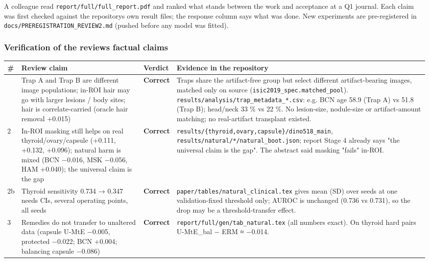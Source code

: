 {\small
A colleague read \texttt{report/full/full\_report.pdf} and ranked what stands between the work and acceptance at a Q1
journal. Each claim was first checked against the repository\textquotesingle s own result files; the response column says what was
done. New experiments are pre-registered in \texttt{docs/PREREGISTRATION\_REVIEW2.md} (pushed before any model was fitted).

\subsubsection{Verification of the review\textquotesingle s factual claims}\label{verification-of-the-reviews-factual-claims}

{ %
\begin{longtable}[]{@{}llll@{}}
\toprule\noalign{}
\# & Review claim & Verdict & Evidence in the repository \\
\midrule\noalign{}
\endhead
\bottomrule\noalign{}
\endlastfoot
1 & Trap A and Trap B are different image populations; in-ROI hair may go with larger lesions / body sites; hair is correlate-carried (oracle hair removal +0.015) & \textbf{Correct} & Traps share the artifact-free group but select different artifact-bearing images, matched only on source (\texttt{isic2019\_spec.matched\_pool}). \texttt{results/analysis/trap\_metadata\_*.csv}: e.g. BCN age 58.9 (Trap A) vs 51.8 (Trap B); head/neck 33 \% vs 22 \%. No lesion-size, nodule-size or artifact-amount matching; no real-artifact transplant existed. \\
2 & In-ROI masking still helps on real thyroid/ovary/capsule (+0.111, +0.132, +0.096); natural harm is mixed (BCN −0.016, MSK −0.056, HAM +0.040); the universal claim is the gap & \textbf{Correct} & \texttt{results/\{thyroid,ovary,capsule\}/dino518\_main}, \texttt{results/natural/*/natural\_boot.json}; report Stage 4 already says "the universal claim is the gap". The abstract said masking "fails" in-ROI. \\
2b & Thyroid sensitivity 0.734 → 0.347 needs CIs, several operating points, all seeds & \textbf{Correct} & \texttt{paper/tables/natural\_clinical.tex} gives mean (SD) over seeds at one validation-fixed threshold only; AUROC is unchanged (0.736 vs 0.731), so the drop may be a threshold-transfer effect. \\
3 & Remedies do not transfer to unaltered data (capsule U-MtE −0.005, protected −0.022; BCN +0.004; balancing capsule −0.086) & \textbf{Correct} & \texttt{report/full/gen/tab\_natural.tex} (all numbers exact). On thyroid hard pairs U-MtE\_bal − ERM ≈ −0.014. \\

\end{longtable}}}
